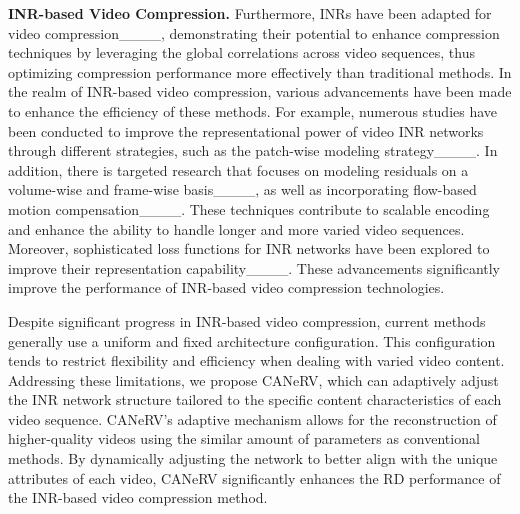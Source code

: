 \noindent \textbf{INR-based Video Compression.}
Furthermore, INRs have been adapted for video compression____, demonstrating their potential to enhance compression techniques by leveraging the global correlations across video sequences, thus optimizing compression performance more effectively than traditional methods.
In the realm of INR-based video compression, various advancements have been made to enhance the efficiency of these methods. For example, numerous studies have been conducted to improve the representational power of video INR networks through different strategies, such as the patch-wise modeling strategy____. In addition, there is targeted research that focuses on modeling residuals on a volume-wise and frame-wise basis____, as well as incorporating flow-based motion compensation____. These techniques contribute to scalable encoding and enhance the ability to handle longer and more varied video sequences. Moreover, sophisticated loss functions for INR networks have been explored to improve their representation capability____. These advancements significantly improve the performance of INR-based video compression technologies.

Despite significant progress in INR-based video compression, current methods generally use a uniform and fixed architecture configuration. This configuration tends to restrict flexibility and efficiency when dealing with varied video content. Addressing these limitations, we propose CANeRV, which can adaptively adjust the INR network structure tailored to the specific content characteristics of each video sequence. CANeRV’s adaptive mechanism allows for the reconstruction of higher-quality videos using the similar amount of parameters as conventional methods. By dynamically adjusting the network to better align with the unique attributes of each video, CANeRV significantly enhances the RD performance of the INR-based video compression method.